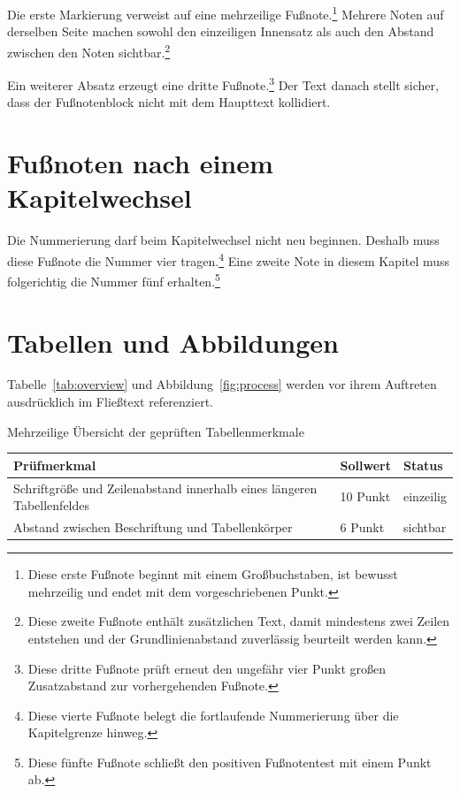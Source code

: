 \documentclass[
  12pt,
  a4paper,
  oneside,
  headings=normal,
  numbers=noendperiod,
  bibliography=totoc
]{scrreprt}
\begin{document}
Die erste Markierung verweist auf eine mehrzeilige Fußnote.\footnote{Diese
erste Fußnote beginnt mit einem Großbuchstaben, ist bewusst mehrzeilig und
endet mit dem vorgeschriebenen Punkt.} Mehrere Noten auf derselben Seite
machen sowohl den einzeiligen Innensatz als auch den Abstand zwischen den
Noten sichtbar.\footnote{Diese zweite Fußnote enthält zusätzlichen Text, damit
mindestens zwei Zeilen entstehen und der Grundlinienabstand zuverlässig
beurteilt werden kann.}

Ein weiterer Absatz erzeugt eine dritte Fußnote.\footnote{Diese dritte
Fußnote prüft erneut den ungefähr vier Punkt großen Zusatzabstand zur
vorhergehenden Fußnote.} Der Text danach stellt sicher, dass der Fußnotenblock
nicht mit dem Haupttext kollidiert.

\chapter{Fußnoten nach einem Kapitelwechsel}

Die Nummerierung darf beim Kapitelwechsel nicht neu beginnen. Deshalb muss
diese Fußnote die Nummer vier tragen.\footnote{Diese vierte Fußnote belegt die
fortlaufende Nummerierung über die Kapitelgrenze hinweg.} Eine zweite Note in
diesem Kapitel muss folgerichtig die Nummer fünf erhalten.\footnote{Diese
fünfte Fußnote schließt den positiven Fußnotentest mit einem Punkt ab.}

\chapter{Tabellen und Abbildungen}

Tabelle~\ref{tab:overview} und Abbildung~\ref{fig:process} werden vor ihrem
Auftreten ausdrücklich im Fließtext referenziert.

\begin{hfhtable}
  \caption{Mehrzeilige Übersicht der geprüften Tabellenmerkmale}
  \label{tab:overview}
  \begin{tabularx}{\textwidth}{@{}Yp{2.4cm}p{2.4cm}@{}}
    \toprule
    \textbf{Prüfmerkmal} & \textbf{Sollwert} & \textbf{Status} \\
    \midrule
    Schriftgröße und Zeilenabstand innerhalb eines längeren Tabellenfeldes &
    10 Punkt & einzeilig \\
    Abstand zwischen Beschriftung und Tabellenkörper &
    6 Punkt & sichtbar \\
    \bottomrule
  \end{tabularx}
\end{hfhtable}
\end{document}
